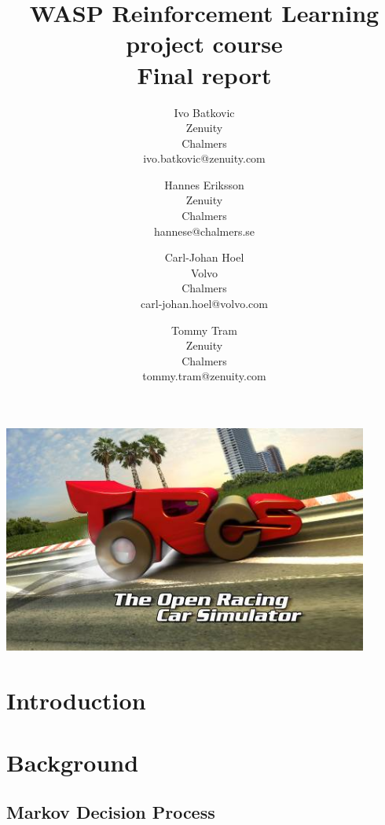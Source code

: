 \documentclass{article}
\begin{document}
\title{WASP Reinforcement Learning project course \\
	Final report}
\author{
	Ivo Batkovic\\
	Zenuity\\
	Chalmers\\
	ivo.batkovic@zenuity.com
	\and
	Hannes Eriksson\\
	Zenuity\\
	Chalmers\\
	hannese@chalmers.se
	\and
	Carl-Johan Hoel\\
	Volvo\\
	Chalmers\\
	carl-johan.hoel@volvo.com
	\and
	Tommy Tram\\
	Zenuity\\
	Chalmers\\
	tommy.tram@zenuity.com
}

\maketitle
\thispagestyle{empty}
\includegraphics[width=12cm]{img/torcs.png} %
\clearpage
\tableofcontents
\clearpage
\section{Introduction}
\setcounter{page}{1}

\section{Background}

\subsection{Markov Decision Process}
\end{document}
